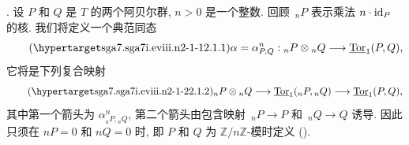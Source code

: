 . 设 $P$ 和 $Q$ 是 $T$ 的两个阿贝尔群, $n>0$ 是一个整数. 回顾 $\,{}_nP$ 表示乘法 $n\cdot\mathrm{id}_P$ 的核. 我们将定义一个典范同态
\begin{equation}\tag{\SGARefTarget{sga7.sga7i.eviii.n2-1-1}{2.1.1}}
 \alpha=\alpha^n_{P,Q}:
 {}_nP\otimes{}_nQ\longrightarrow\uTor_1(P,Q),
\end{equation}
它将是下列复合映射
\begin{equation}\tag{\SGARefTarget{sga7.sga7i.eviii.n2-1-2}{2.1.2}}
 {}_nP\otimes{}_nQ
 \longrightarrow \uTor_1({}_nP,{}_nQ)
 \longrightarrow \uTor_1(P,Q),
\end{equation}
其中第一个箭头为 $\alpha^n_{{}_nP,{}_nQ}$, 第二个箭头由包含映射 $\,{}_nP\longrightarrow P$ 和 $\,{}_nQ\longrightarrow Q$ 诱导. 因此只须在 $nP=0$ 和 $nQ=0$ 时, 即 $P$ 和 $Q$ 为 $\mathbb Z/n\mathbb Z$-模时定义 ().

